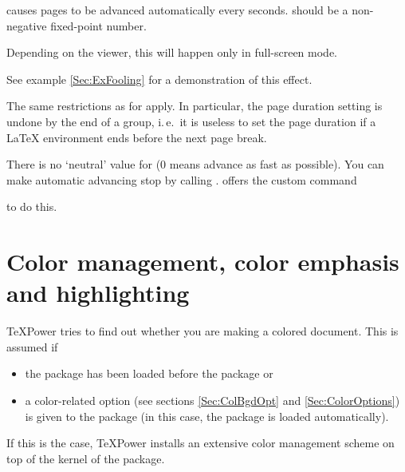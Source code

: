 \begin{slide}
  causes pages to be advanced automatically every 
  seconds.  should be a non-negative fixed-point number.

  \pause

  Depending on the  viewer, this will happen only in full-screen mode.

  See example \ref{Sec:ExFooling} for a demonstration of this effect.

  \stopAdvancing

  \newslide

  The same restrictions as for  apply. In particular, the page duration setting is undone by
  the end of a group, i.\,e.\ it is useless to set the page duration if a \LaTeX{} environment ends before the next page
  break.

  There is no `neutral' value for  ($0$ means advance as fast as possible). You can make automatic advancing
  stop by calling .  offers the custom command
  \begin{center}
  \end{center}
  to do this.

  \newslide

  \section{Color management, color emphasis and highlighting}\label{Sec:ColorEmphasis}
  \TeX Power tries to find out whether you are making a colored document. This is assumed if
  \begin{itemize}
  \item the \href{ftp://ftp.dante.de/tex-archive/help/Catalogue/entries/color.html}{} package has been
    loaded before the  package or
  \item a color-related option (see sections \ref{Sec:ColBgdOpt} and \ref{Sec:ColorOptions}) is given to the
     package (in this case, the
    \href{ftp://ftp.dante.de/tex-archive/help/Catalogue/entries/color.html}{} package is loaded
    automatically).
  \end{itemize}
  If this is the case, \TeX Power installs an extensive color management scheme on top of the kernel of the
  \href{ftp://ftp.dante.de/tex-archive/help/Catalogue/entries/color.html}{} package.


\end{slide}
